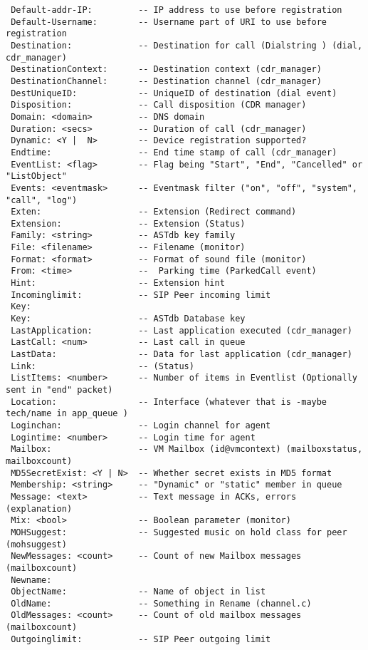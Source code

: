 \begin{verbatim}
 Default-addr-IP:         -- IP address to use before registration
 Default-Username:        -- Username part of URI to use before registration
 Destination:             -- Destination for call (Dialstring ) (dial, cdr_manager)
 DestinationContext:      -- Destination context (cdr_manager)
 DestinationChannel:      -- Destination channel (cdr_manager)
 DestUniqueID:            -- UniqueID of destination (dial event)
 Disposition:             -- Call disposition (CDR manager)
 Domain: <domain>         -- DNS domain
 Duration: <secs>         -- Duration of call (cdr_manager)
 Dynamic: <Y |  N>        -- Device registration supported?
 Endtime:                 -- End time stamp of call (cdr_manager)
 EventList: <flag>        -- Flag being "Start", "End", "Cancelled" or "ListObject"
 Events: <eventmask>      -- Eventmask filter ("on", "off", "system", "call", "log")
 Exten:                   -- Extension (Redirect command)
 Extension:               -- Extension (Status)
 Family: <string>         -- ASTdb key family
 File: <filename>         -- Filename (monitor)
 Format: <format>         -- Format of sound file (monitor)
 From: <time>             --  Parking time (ParkedCall event)
 Hint:                    -- Extension hint
 Incominglimit:           -- SIP Peer incoming limit
 Key:
 Key:                     -- ASTdb Database key
 LastApplication:         -- Last application executed (cdr_manager)
 LastCall: <num>          -- Last call in queue
 LastData:                -- Data for last application (cdr_manager)
 Link:                    -- (Status)
 ListItems: <number>      -- Number of items in Eventlist (Optionally sent in "end" packet)
 Location:                -- Interface (whatever that is -maybe tech/name in app_queue )
 Loginchan:               -- Login channel for agent
 Logintime: <number>      -- Login time for agent
 Mailbox:                 -- VM Mailbox (id@vmcontext) (mailboxstatus, mailboxcount)
 MD5SecretExist: <Y | N>  -- Whether secret exists in MD5 format
 Membership: <string>     -- "Dynamic" or "static" member in queue
 Message: <text>          -- Text message in ACKs, errors (explanation)
 Mix: <bool>              -- Boolean parameter (monitor)
 MOHSuggest:              -- Suggested music on hold class for peer (mohsuggest)
 NewMessages: <count>     -- Count of new Mailbox messages (mailboxcount)
 Newname:
 ObjectName:              -- Name of object in list
 OldName:                 -- Something in Rename (channel.c)
 OldMessages: <count>     -- Count of old mailbox messages (mailboxcount)
 Outgoinglimit:           -- SIP Peer outgoing limit

\end{verbatim}
